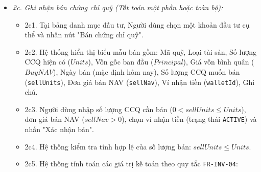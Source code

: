 \documentclass[11pt,a4paper]{article}
\providecommand{\tightlist}{
  \setlength{\itemsep}{0pt}\setlength{\parskip}{0pt}}
\begin{document}
\begin{itemize}
\begin{itemize}
\begin{itemize}
\begin{itemize}
        \begin{itemize}
        \tightlist
        \item
          Nếu \(HoldDays \ge 30\) ngày và \(Principal > 0\):
          \[AnnualizedRate = \left[ \left( \frac{Balance}{Principal} \right)^{\frac{365}{HoldDays}} - 1 \right] \times 100\%\]
        \item
          Nếu \(HoldDays < 30\) ngày: Hiển thị giá trị
          \(AbsoluteReturn\) kèm ghi chú "Chưa đủ 30 ngày để quy đổi
          năm" để ngăn chặn sai lệch thống kê số mũ.
        \end{itemize}
      \end{itemize}
    \item
      2b3. Hệ thống tổng hợp các chỉ tiêu toàn danh mục: Tổng vốn đầu tư
      ban đầu, Tổng giá trị thị trường hiện tại, Tổng lãi lỗ danh nghĩa
      toàn danh mục, Tỷ trọng phân bổ theo từng loại quỹ
      (\texttt{STOCK}, \texttt{BOND}, \texttt{BALANCE}).
    \item
      2b4. Hệ thống hiển thị bảng dữ liệu chi tiết kèm các đồ thị phân
      bổ tỷ trọng và đường cong tăng trưởng NAV theo thời gian.
    \end{itemize}
  \item
    \emph{2c. Ghi nhận bán chứng chỉ quỹ (Tất toán một phần hoặc toàn
    bộ):}

    \begin{itemize}
    \tightlist
    \item
      2c1. Tại bảng danh mục đầu tư, Người dùng chọn một khoản đầu tư cụ
      thể và nhấn nút "Bán chứng chỉ quỹ".
    \item
      2c2. Hệ thống hiển thị biểu mẫu bán gồm: Mã quỹ, Loại tài sản, Số
      lượng CCQ hiện có (\(Units\)), Vốn gốc ban đầu (\(Principal\)),
      Giá vốn bình quân (\(BuyNAV\)), Ngày bán (mặc định hôm nay), Số
      lượng CCQ muốn bán (\texttt{sellUnits}), Đơn giá bán NAV
      (\texttt{sellNav}), Ví nhận tiền (\texttt{walletId}), Ghi chú.
    \item
      2c3. Người dùng nhập số lượng CCQ cần bán
      (\(0 < sellUnits \le Units\)), đơn giá bán NAV (\(sellNav > 0\)),
      chọn ví nhận tiền (trạng thái \texttt{ACTIVE}) và nhấn "Xác nhận
      bán".
    \item
      2c4. Hệ thống kiểm tra tính hợp lệ của số lượng bán:
      \(sellUnits \le Units\).
    \item
      2c5. Hệ thống tính toán các giá trị kế toán theo quy tắc
      \texttt{FR-INV-04}:


\end{itemize}
\end{itemize}
\end{itemize}
\end{document}
